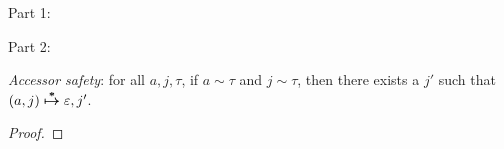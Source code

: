 \documentclass[11pt]{article}
\newcommand{\matches}[2]{{#1}\sim{#2}}   %
\newcommand{\aeps}{\varepsilon}          %
\begin{document}

Part 1:

\begin{mathpar}
\end{mathpar}

Part 2:

\begin{mathpar}
\end{mathpar}

\textit{Accessor safety}: for all $a, j, \tau$, if $\matches{a}{\tau}$ and $\matches{j}{\tau}$, then there exists a $j'$ such that $\evals{(a, j)}{\aeps, j'}$.

\begin{proof}
\end{proof}
\end{document}
